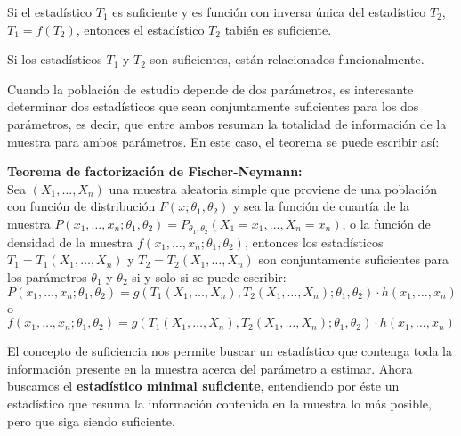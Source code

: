 \begin{teorema}
Si el estad\'istico $T_1$ es suficiente y es funci\'on con inversa \'unica del estad\'istico $T_2$, $T_1=f(T_2)$, entonces el estad\'istico $T_2$ tabi\'en es suficiente.
\end{teorema}

\begin{teorema}
Si los estad\'isticos $T_1$ y $T_2$ son suficientes, est\'an relacionados funcionalmente.
\end{teorema}

Cuando la poblaci\'on de estudio depende de dos par\'ametros, es interesante determinar dos estad\'isticos que sean conjuntamente suficientes para los dos par\'ametros, es decir, que entre ambos resuman la totalidad de informaci\'on de la muestra para ambos par\'ametros. En este caso, el teorema se puede escribir as\'i:

\begin{teorema}
\textbf{Teorema de factorizaci\'on de Fischer-Neymann:}\\
Sea $(X_1,\ldots,X_n)$ una muestra aleatoria simple que proviene de una poblaci\'on con funci\'on de distribuci\'on $F(x;\theta_1,\theta_2)$ y sea la funci\'on de cuant\'ia de la muestra $P(x_1,\ldots,x_n;\theta_1,\theta_2)=P_{\theta_1,\theta_2}(X_1=x_1,\ldots,X_n=x_n)$, o la funci\'on de densidad de la muestra $f(x_1,\ldots,x_n;\theta_1,\theta_2)$, entonces los estad\'isticos $T_1=T_1(X_1,\ldots,X_n)$ y $T_2=T_2(X_1,\ldots,X_n)$ son conjuntamente suficientes para los par\'ametros $\theta_1$ y $\theta_2$ si y solo si se puede escribir:
\begin{equation*}
P(x_1,\ldots,x_n;\theta_1,\theta_2)=g(T_1(X_1,\ldots,X_n),T_2(X_1,\ldots,X_n);\theta_1,\theta_2)\cdot h(x_1,\ldots,x_n)
\end{equation*}
o
\begin{equation*}
f(x_1,\ldots,x_n;\theta_1,\theta_2)=g(T_1(X_1,\ldots,X_n),T_2(X_1,\ldots,X_n);\theta_1,\theta_2)\cdot h(x_1,\ldots,x_n)
\end{equation*}
\end{teorema}

El concepto de suficiencia nos permite buscar un estad\'istico que contenga toda la informaci\'on presente en la muestra acerca del par\'ametro a estimar. Ahora buscamos el \textbf{estad\'istico minimal suficiente}, entendiendo por \'este un estad\'istico que resuma la informaci\'on contenida en la muestra lo m\'as posible, pero que siga siendo suficiente.

